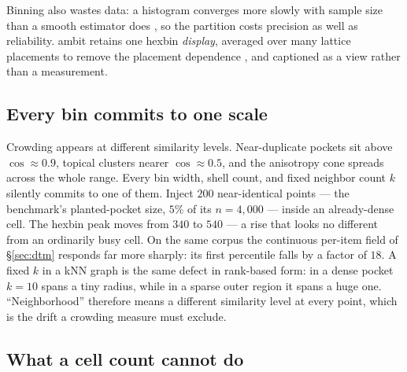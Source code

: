 \documentclass[11pt,letterpaper]{article}
\begin{document}
Binning also wastes data: a histogram converges more slowly with
sample size than a smooth estimator does
\cite{scott1979,freedman1981}, so the partition costs precision as
well as reliability. \textsf{ambit} retains one hexbin \emph{display},
averaged over many lattice placements to remove the placement
dependence \cite{scott1985}, and captioned as a view rather than a
measurement.

\subsection{Every bin commits to one scale}

Crowding appears at different similarity levels. Near-duplicate pockets
sit above $\cos \approx 0.9$, topical clusters nearer $\cos \approx 0.5$,
and the anisotropy cone spreads across the whole range. Every bin width,
shell count, and fixed neighbor count $k$ silently commits to one of them.
Inject $200$ near-identical points --- the benchmark's planted-pocket
size, $5\%$ of its $n = 4{,}000$ --- inside an already-dense cell. The
hexbin peak moves from $340$ to $540$ --- a rise that looks no different
from an ordinarily busy cell. On the same corpus the continuous per-item
field of \S\ref{sec:dtm} responds far more sharply: its first percentile
falls by a factor of $18$. A fixed $k$ in a kNN graph is the same defect
in rank-based form: in a dense pocket $k{=}10$ spans a tiny radius, while
in a sparse outer region it spans a huge one. ``Neighborhood'' therefore
means a different similarity level at every point, which is the drift a
crowding measure must exclude.

\subsection{What a cell count cannot do}
\end{document}
